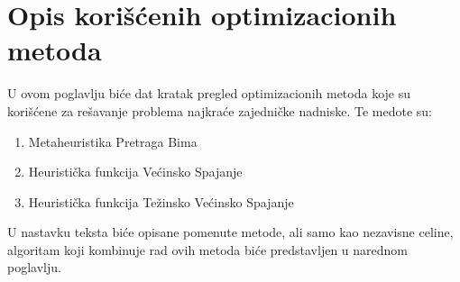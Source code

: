 \documentclass[12pt,oneside]{memoir}
\begin{document}





\chapter{Opis korišćenih optimizacionih metoda}
\label{chp:opisMetoda}




U ovom poglavlju biće dat kratak pregled optimizacionih metoda koje su korišćene za rešavanje problema najkraće
zajedničke nadniske. Te medote su:
\begin{enumerate}
  \item Metaheuristika Pretraga Bima
  \item Heuristička funkcija Većinsko Spajanje
  \item Heuristička funkcija Težinsko Većinsko Spajanje
\end{enumerate}
U nastavku teksta biće opisane pomenute metode, ali samo kao nezavisne celine, algoritam koji kombinuje
rad ovih metoda biće predstavljen u narednom poglavlju.
\end{document}
